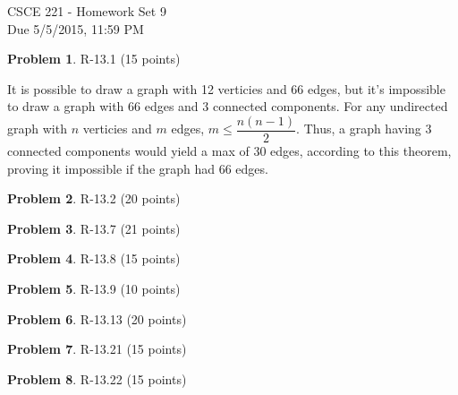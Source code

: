 \documentclass[12pt]{report}
\theoremstyle{definition}
\newtheorem{problem}{Problem}
\begin{document}
\vspace*{-15mm}
\begin{center}
{\large
				CSCE 221 - Homework Set 9 \\
				Due 5/5/2015, 11:59 PM}
\end{center}

\begin{problem} R-13.1 (15 points)
\end{problem}




It is possible to draw a graph with 12 verticies and 66 edges, but it's impossible to draw a graph with 66 edges and 3 connected components. For any undirected graph with $n$ verticies and $m$ edges,  $m \le \dfrac{n(n-1)}{2}$. Thus, a graph having 3 connected components would yield a max of 30 edges, according to this theorem, proving it impossible if the graph had 66 edges.

\begin{problem} R-13.2 (20 points)
\end{problem}

\begin{problem} R-13.7 (21 points)
\end{problem}

\begin{problem} R-13.8 (15 points)
\end{problem}

\begin{problem} R-13.9 (10 points)
\end{problem}

\begin{problem} R-13.13 (20 points)
\end{problem}

\begin{problem} R-13.21 (15 points)
\end{problem}

\begin{problem} R-13.22 (15 points)
\end{problem}
\end{document}
